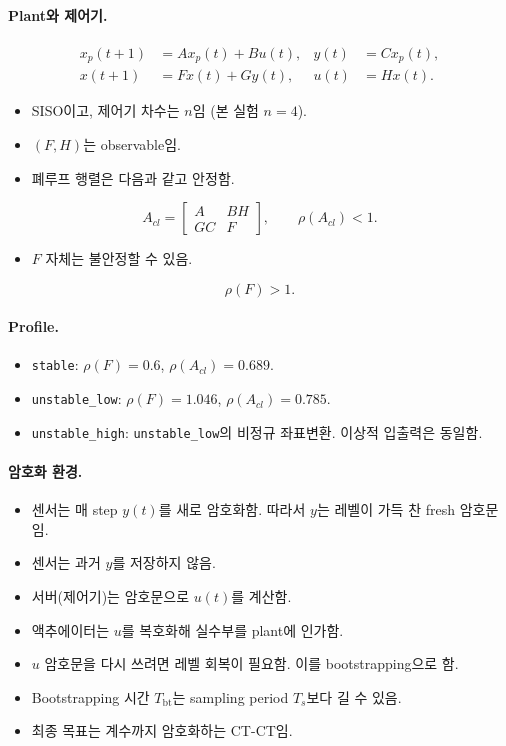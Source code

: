 \documentclass[11pt,a4paper]{article}
\begin{document}
\paragraph{Plant와 제어기.}
\begin{align}
x_p(t+1)&=Ax_p(t)+Bu(t), & y(t)&=Cx_p(t), \label{eq:plant}\\
x(t+1)&=Fx(t)+Gy(t), & u(t)&=Hx(t). \label{eq:ctrl}
\end{align}
\begin{itemize}
\item SISO이고, 제어기 차수는 $n$임 (본 실험 $n=4$).
\item $(F,H)$는 observable임.
\item 폐루프 행렬은 다음과 같고 안정함.
\end{itemize}
\begin{equation}
A_{cl}=\begin{bmatrix}A&BH\\GC&F\end{bmatrix},\qquad \rho(A_{cl})<1 .
\end{equation}
\begin{itemize}
\item $F$ 자체는 불안정할 수 있음.
\end{itemize}
\begin{equation}
\rho(F)>1 .
\end{equation}

\paragraph{Profile.}
\begin{itemize}
\item \texttt{stable}: $\rho(F)=0.6$, $\rho(A_{cl})=0.689$.
\item \texttt{unstable\_low}: $\rho(F)=1.046$, $\rho(A_{cl})=0.785$.
\item \texttt{unstable\_high}: \texttt{unstable\_low}의 비정규 좌표변환. 이상적 입출력은 동일함.
\end{itemize}

\paragraph{암호화 환경.}
\begin{itemize}
\item 센서는 매 step $y(t)$를 새로 암호화함. 따라서 $y$는 레벨이 가득 찬 fresh 암호문임.
\item 센서는 과거 $y$를 저장하지 않음.
\item 서버(제어기)는 암호문으로 $u(t)$를 계산함.
\item 액추에이터는 $u$를 복호화해 실수부를 plant에 인가함.
\item $u$ 암호문을 다시 쓰려면 레벨 회복이 필요함. 이를 bootstrapping으로 함.
\item Bootstrapping 시간 $T_{\mathrm{bt}}$는 sampling period $T_s$보다 길 수 있음.
\item 최종 목표는 계수까지 암호화하는 CT-CT임.
\end{itemize}
\end{document}

